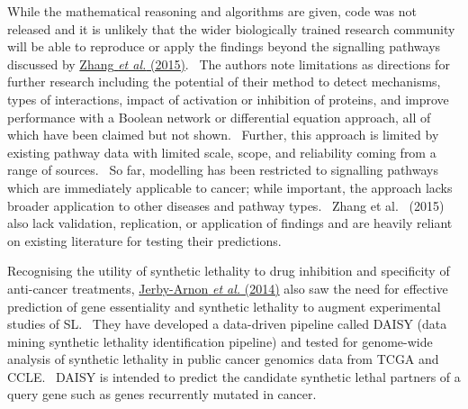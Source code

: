 While the mathematical reasoning and algorithms are given, code was not
released and it is unlikely that the wider biologically trained
research community will be able to reproduce or apply the findings
beyond the signalling pathways discussed by
\hyperlink{ENREF117}{Zhang}\hyperlink{ENREF117}{\textit{ et
al.}}\hyperlink{ENREF117}{ (2015)}. \ The authors note limitations as
directions for further research including the potential of their method
to detect mechanisms, types of interactions, impact of activation or
inhibition of proteins, and improve performance with a Boolean network
or differential equation approach, all of which have been claimed but
not shown. \ Further, this approach is limited by existing pathway data
with limited scale, scope, and reliability coming from a range of
sources. \ So far, modelling has been restricted to signalling pathways
which are immediately applicable to cancer; while important, the
approach lacks broader application to other diseases and pathway types.
\ Zhang et al. \ (2015) also lack validation, replication, or
application of findings and are heavily reliant on existing literature
for testing their predictions. \ 


Recognising the utility of synthetic lethality to drug inhibition and
specificity of anti-cancer treatments,
\hyperlink{ENREF53}{Jerby-Arnon}\hyperlink{ENREF53}{\textit{ et
al.}}\hyperlink{ENREF53}{ (2014)} also saw the need for effective
prediction of gene essentiality and synthetic lethality to augment
experimental studies of SL. \ They have developed a data-driven
pipeline called DAISY (data mining synthetic lethality identification
pipeline) and tested for genome-wide analysis of synthetic lethality in
public cancer genomics data from TCGA and CCLE. \ DAISY is intended to
predict the candidate synthetic lethal partners of a query gene such as
genes recurrently mutated in cancer. \ 


